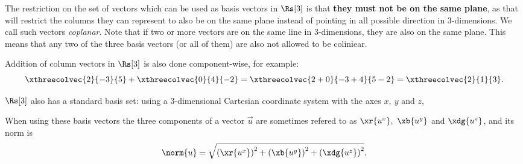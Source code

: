 The restriction on the set of vectors which can be used as basis vectors in $\Rs[3]$ is that \textbf{they must not be on the same plane}, as that will restrict the columns they can represent to also be on the same plane instead of pointing in all possible direction in $3$-dimensions. We call such vectors \emph{coplanar}. Note that if two or more vectors are on the same line in $3$-dimensions, they are also on the same plane. This means that any two of the three basis vectors (or all of them) are also not allowed to be coliniear.


Addition of column vectors in $\Rs[3]$ is also done component-wise, for example:
\[
  \xthreecolvec{2}{-3}{5} + \xthreecolvec{0}{4}{-2} = \xthreecolvec{2+0}{-3+4}{5-2} = \xthreecolvec{2}{1}{3}.
\]

$\Rs[3]$ also has a standard basis set: using a 3-dimensional Cartesian coordinate system with the axes $x,\ y$ and $z$,

\begin{center}
\end{center}

When using these basis vectors the three components of a vector $\vec{u}$ are sometimes refered to as $\xr{u^{x}},\ \xb{u^{y}}$ and $\xdg{u^{z}}$, and its norm is
\begin{equation}
  \norm{u} = \sqrt{\left(\xr{u^{x}}\right)^{2} + \left(\xb{u^{y}}\right)^{2} + \left(\xdg{u^{z}}\right)^{2}}.
  \label{eq:3d_norm_pythagorean}
\end{equation}

